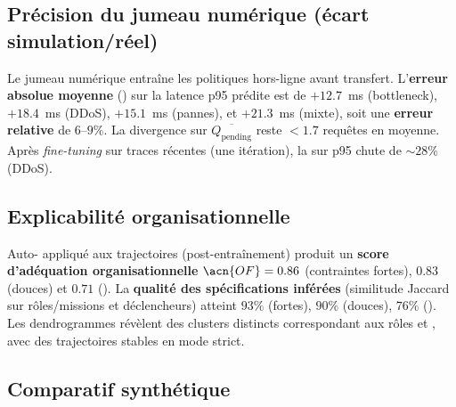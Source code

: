 \subsection*{Précision du jumeau numérique (écart simulation/réel)}

Le jumeau numérique entraîne les politiques hors-ligne avant transfert.
L'\textbf{erreur absolue moyenne} () sur la latence p95 prédite est de $+12.7$~ms (bottleneck), $+18.4$~ms (DDoS), $+15.1$~ms (pannes), et $+21.3$~ms (mixte), soit une \textbf{erreur relative} de $6$--$9\%$.
La divergence sur $\overline{Q_{\text{pending}}}$ reste $<1.7$ requêtes en moyenne.
Après \textit{fine-tuning} sur traces récentes (une itération), la  sur p95 chute de $\sim 28\%$ (DDoS).

\subsection*{Explicabilité organisationnelle}

Auto- appliqué aux trajectoires (post-entraînement) produit un \textbf{score d'adéquation organisationnelle} $\acn{OF}=0.86$ (contraintes fortes), $0.83$ (douces) et $0.71$ ().
La \textbf{qualité des spécifications inférées} (similitude Jaccard sur rôles/missions et déclencheurs) atteint $93\%$ (fortes), $90\%$ (douces), $76\%$ ().
Les dendrogrammes révèlent des clusters distincts correspondant aux rôles  et , avec des trajectoires stables en mode strict.

\subsection*{Comparatif synthétique}


